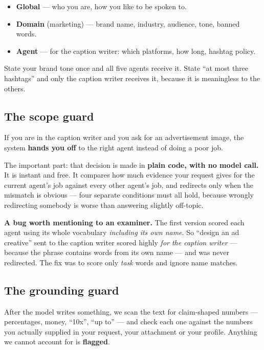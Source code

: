 \documentclass[11pt]{article}
\begin{document}
\begin{itemize}
\item \textbf{Global} --- who you are, how you like to be spoken to.
\item \textbf{Domain} (marketing) --- brand name, industry, audience, tone,
      banned words.
\item \textbf{Agent} --- for the caption writer: which platforms, how long,
      hashtag policy.
\end{itemize}

State your brand tone once and all five agents receive it. State ``at most three
hashtags'' and only the caption writer receives it, because it is meaningless to
the others.

\subsection{The scope guard}

If you are in the caption writer and you ask for an advertisement image, the
system \textbf{hands you off} to the right agent instead of doing a poor job.

The important part: that decision is made in \textbf{plain code, with no model
call.} It is instant and free. It compares how much evidence your request gives
for the current agent's job against every other agent's job, and redirects only
when the mismatch is obvious --- four separate conditions must all hold, because
wrongly redirecting somebody is worse than answering slightly off-topic.

\begin{callout}
\textbf{A bug worth mentioning to an examiner.} The first version scored each
agent using its whole vocabulary \emph{including its own name}. So ``design an
ad creative'' sent to the caption writer scored highly \emph{for the caption
writer} --- because the phrase contains words from its own name --- and was
never redirected. The fix was to score only \emph{task} words and ignore name
matches.
\end{callout}

\subsection{The grounding guard}

After the model writes something, we scan the text for claim-shaped numbers ---
percentages, money, ``10x'', ``up to'' --- and check each one against the
numbers you actually supplied in your request, your attachment or your profile.
Anything we cannot account for is \textbf{flagged}.
\end{document}
